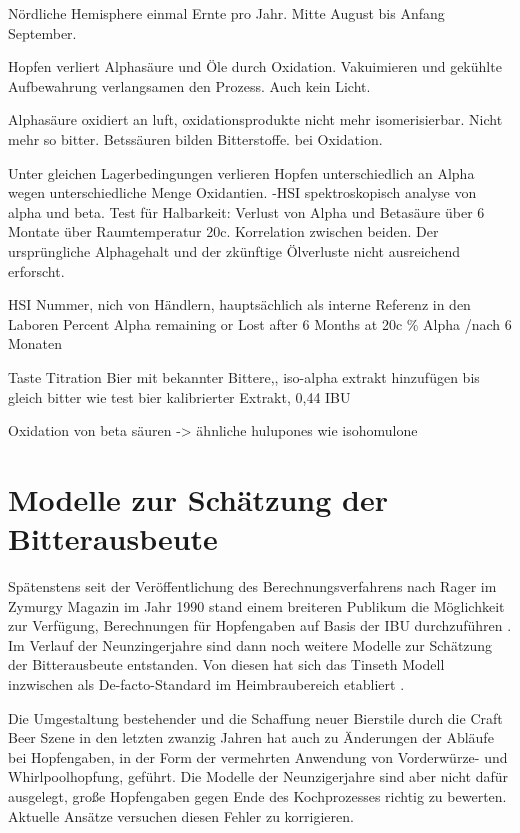 \documentclass[a4paper,parskip=half]{scrartcl}
\begin{document}
Nördliche Hemisphere einmal Ernte pro Jahr. Mitte August bis
Anfang September.
\parencite[97]{Garetz1994}

\parencite[97]{Garetz1994} Hopfen verliert Alphasäure und Öle
durch Oxidation. Vakuimieren und gekühlte Aufbewahrung verlangsamen
den Prozess. Auch kein Licht. 

\parencite[103]{Garetz1994} Alphasäure oxidiert an luft, oxidationsprodukte
nicht mehr isomerisierbar. Nicht mehr so bitter. Betssäuren bilden
Bitterstoffe. bei Oxidation.

\parencite[104]{Garetz1994} 
Unter gleichen Lagerbedingungen verlieren Hopfen unterschiedlich an
Alpha wegen unterschiedliche Menge Oxidantien.
-HSI spektroskopisch analyse von alpha und beta. Test für Halbarkeit:
Verlust von Alpha und Betasäure über 6 Montate über Raumtemperatur 20c.
Korrelation zwischen beiden. Der ursprüngliche Alphagehalt und der
zkünftige
Ölverluste nicht ausreichend erforscht.

\parencite[104]{Garetz1994} 
HSI Nummer, nich von Händlern, hauptsächlich als interne Referenz
in den Laboren
Percent Alpha remaining or Lost after 6 Months at 20c
\% Alpha /nach 6 Monaten

\parencite[145-151]{Garetz1994}
Taste Titration 
Bier mit bekannter Bittere,, iso-alpha extrakt hinzufügen
bis gleich bitter wie test bier kalibrierter Extrakt, 0,44 IBU

\parencite[52]{Davidson1997}
Oxidation von beta säuren -> ähnliche hulupones wie isohomulone



\section*{Modelle zur Schätzung der Bitterausbeute}

Spätenstens seit der Veröffentlichung des Berechnungsverfahrens nach
Rager im Zymurgy Magazin im Jahr 1990 stand einem breiteren
Publikum die Möglichkeit zur Verfügung, Berechnungen für Hopfengaben auf
Basis der IBU
durchzuführen \parencite[59]{Hall1997}. Im Verlauf der Neunzingerjahre
sind dann noch weitere Modelle zur Schätzung der Bitterausbeute entstanden.
Von diesen hat sich das Tinseth Modell inzwischen als De-facto-Standard im
Heimbraubereich etabliert \parencite[185]{Hieronymus2012}.

Die Umgestaltung bestehender und die Schaffung neuer Bierstile
durch die Craft Beer Szene in den letzten zwanzig Jahren hat auch zu Änderungen
der Abläufe bei Hopfengaben, in der Form der vermehrten Anwendung von Vorderwürze-
und Whirlpoolhopfung, geführt. Die Modelle der Neunzigerjahre sind aber
nicht dafür ausgelegt, große Hopfengaben gegen Ende des Kochprozesses richtig
zu bewerten. Aktuelle Ansätze versuchen diesen Fehler zu korrigieren.
\parencite[39]{Novotny2018}
\end{document}
